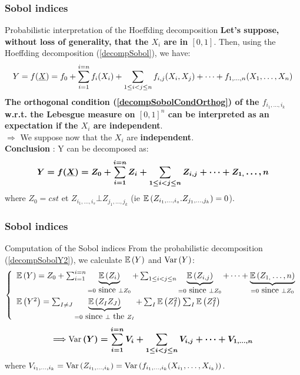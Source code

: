 \documentclass[8pt]{beamer}
\begin{document}
\begin{frame}
  \frametitle{Sobol indices}
\small
  \begin{block}{Probabilistic interpretation of the Hoeffding decomposition}
    \alert{\bf Let's suppose, without loss of generality, that the  $X_i$ are in $[0,1]$}. Then, using the Hoeffding decomposition (\ref{decompSobol}), we have:
    \begin{equation}
      \label{decompSobolY}
      Y = f({\underline{X}}) = f_0 + \sum_{i=1}^{i=n}f_i(X_i) + \sum_{1\leq i < j \leq n} f_{i,j} (X_i, X_j) + \dots + f_{1, \dots, n}(X_1, \dots, X_n)
    \end{equation}
    {\bf The orthogonal condition (\ref{decompSobolCondOrthog}) of the  $f_{i_1, \dots, i_k}$  w.r.t. the Lebesgue measure on $[0,1]^n$ can be interpreted as an expectation if the $X_i$ are independent}.\\
    \alert{$\Longrightarrow$} We  suppose now that the $X_i$ are  \alert{\bf independent}.\\

    \alert{\bf Conclusion} :     Y can be decomposed as:
    \begin{equation}
      \label{decompSobolY2}
      \boldsymbol{ Y = f({\underline{X}}) = Z_0 + \sum_{i=1}^{i=n}Z_i + \sum_{1\leq i < j \leq n} Z_{i,j}  + \dots + Z_{1,} \dots, n}
    \end{equation}
    where $Z_0 = cst$ et $Z_{i_1, \dots, i_s} \bot  Z_{j_1, \dots, j_k}$ (ie $\mathbb{E}\left( Z_{i_1, \dots, i_s}.Z_{j_1, \dots, j_k} \right)=0$).
  \end{block}
\end{frame}


\begin{frame}
  \frametitle{Sobol indices}
\small
  \begin{block}{Computation of the Sobol indices}
    \small{
      From the probabilistic decomposition (\ref{decompSobolY2}), we calculate $\mathbb{E}\left( Y \right)$ and $\mbox{Var}\left( Y \right)$:
      $$
      \left\{
        \begin{array}{l}
          \mathbb{E}\left( Y \right)  =  Z_0 + \sum_{i=1}^{i=n}\underbrace{\mathbb{E}\left( Z_i \right)}_{=0 \mbox{ since } \bot Z_0} + \sum_{1\leq i < j \leq n} \underbrace{\mathbb{E}\left( Z_{i,j} \right)}_{=0 \mbox{ since } \bot Z_0}  + \dots + \underbrace{\mathbb{E}\left( Z_{1,} \dots, n \right)}_{=0 \mbox{ since } \bot Z_0}  \\[2em]
          \mathbb{E}\left( Y^2 \right)   =   \sum_{I \neq J} \underbrace{\mathbb{E}\left( Z_IZ_J \right)}_{=0 \mbox{ since } \bot \mbox{ the } Z_I} + \sum_I \mathbb{E}\left( Z_I^2 \right)  \sum_I \mathbb{E}\left( Z_I^2 \right)
        \end{array}
      \right.
      $$
      \begin{eqnarray}
        \label{VarY}
        \Longrightarrow \boldsymbol{\mbox{Var}\left( Y \right) = \sum_{i=1}^{i=n} V_i + \sum_{1\leq i < j \leq n} V_{i,j}  + \dots + V_{1, \dots, n}}
      \end{eqnarray}
      where $V_{i_1, \dots, i_k} = \mbox{Var}\left( Z_{i_1, \dots, i_k} \right) = \mbox{Var}\left( f_{i_1, \dots, i_k}(X_{i_1}, \dots, X_{i_k}) \right)$.
    }
  \end{block}
\end{frame}
\end{document}
